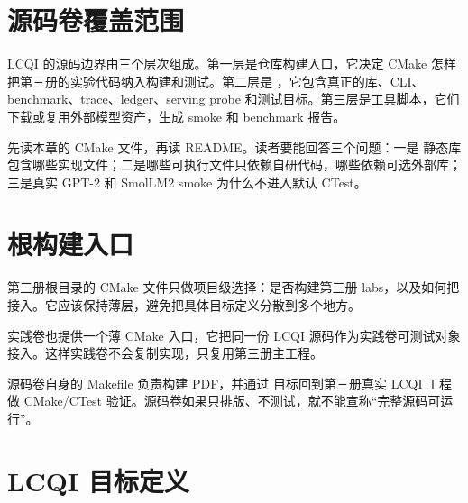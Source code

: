 \section{源码卷覆盖范围}

LCQI 的源码边界由三个层次组成。第一层是仓库构建入口，它决定 CMake 怎样把第三册的实验代码纳入构建和测试。第二层是 ，它包含真正的库、CLI、benchmark、trace、ledger、serving probe 和测试目标。第三层是工具脚本，它们下载或复用外部模型资产，生成 smoke 和 benchmark 报告。

\begin{sourcereadingbox}
先读本章的 CMake 文件，再读 README。读者要能回答三个问题：一是  静态库包含哪些实现文件；二是哪些可执行文件只依赖自研代码，哪些依赖可选外部库；三是真实 GPT-2 和 SmolLM2 smoke 为什么不进入默认 CTest。
\end{sourcereadingbox}

\section{根构建入口}

第三册根目录的 CMake 文件只做项目级选择：是否构建第三册 labs，以及如何把  接入。它应该保持薄层，避免把具体目标定义分散到多个地方。





实践卷也提供一个薄 CMake 入口，它把同一份 LCQI 源码作为实践卷可测试对象接入。这样实践卷不会复制实现，只复用第三册主工程。



源码卷自身的 Makefile 负责构建 PDF，并通过  目标回到第三册真实 LCQI 工程做 CMake/CTest 验证。源码卷如果只排版、不测试，就不能宣称“完整源码可运行”。





\section{LCQI 目标定义}

